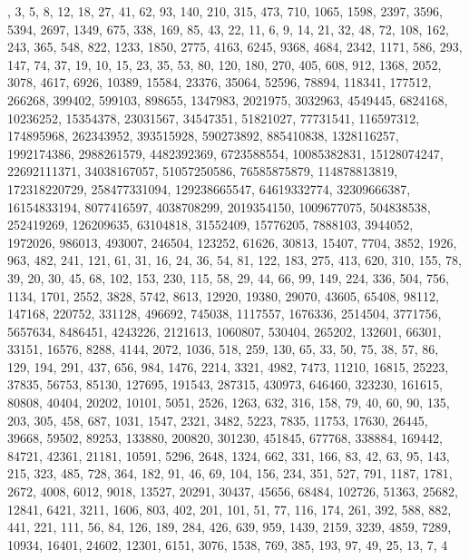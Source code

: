 \documentclass[11pt]{article}
\begin{document}
\begin{table}[h!]
\centering\footnotesize
\begin{minipage}{0.96\textwidth}
\raggedright{}, 3, 5, 8, 12, 18, 27, 41, 62, 93, 140, 210, 315, 473, 710, 1065, 1598, 2397, 3596, 5394, 2697, 1349, 675, 338, 169, 85, 43, 22, 11, 6, 9, 14, 21, 32, 48, 72, 108, 162, 243, 365, 548, 822, 1233, 1850, 2775, 4163, 6245, 9368, 4684, 2342, 1171, 586, 293, 147, 74, 37, 19, 10, 15, 23, 35, 53, 80, 120, 180, 270, 405, 608, 912, 1368, 2052, 3078, 4617, 6926, 10389, 15584, 23376, 35064, 52596, 78894, 118341, 177512, 266268, 399402, 599103, 898655, 1347983, 2021975, 3032963, 4549445, 6824168, 10236252, 15354378, 23031567, 34547351, 51821027, 77731541, 116597312, 174895968, 262343952, 393515928, 590273892, 885410838, 1328116257, 1992174386, 2988261579, 4482392369, 6723588554, 10085382831, 15128074247, 22692111371, 34038167057, 51057250586, 76585875879, 114878813819, 172318220729, 258477331094, 129238665547, 64619332774, 32309666387, 16154833194, 8077416597, 4038708299, 2019354150, 1009677075, 504838538, 252419269, 126209635, 63104818, 31552409, 15776205, 7888103, 3944052, 1972026, 986013, 493007, 246504, 123252, 61626, 30813, 15407, 7704, 3852, 1926, 963, 482, 241, 121, 61, 31, 16, 24, 36, 54, 81, 122, 183, 275, 413, 620, 310, 155, 78, 39, 20, 30, 45, 68, 102, 153, 230, 115, 58, 29, 44, 66, 99, 149, 224, 336, 504, 756, 1134, 1701, 2552, 3828, 5742, 8613, 12920, 19380, 29070, 43605, 65408, 98112, 147168, 220752, 331128, 496692, 745038, 1117557, 1676336, 2514504, 3771756, 5657634, 8486451, 4243226, 2121613, 1060807, 530404, 265202, 132601, 66301, 33151, 16576, 8288, 4144, 2072, 1036, 518, 259, 130, 65, 33, 50, 75, 38, 57, 86, 129, 194, 291, 437, 656, 984, 1476, 2214, 3321, 4982, 7473, 11210, 16815, 25223, 37835, 56753, 85130, 127695, 191543, 287315, 430973, 646460, 323230, 161615, 80808, 40404, 20202, 10101, 5051, 2526, 1263, 632, 316, 158, 79, 40, 60, 90, 135, 203, 305, 458, 687, 1031, 1547, 2321, 3482, 5223, 7835, 11753, 17630, 26445, 39668, 59502, 89253, 133880, 200820, 301230, 451845, 677768, 338884, 169442, 84721, 42361, 21181, 10591, 5296, 2648, 1324, 662, 331, 166, 83, 42, 63, 95, 143, 215, 323, 485, 728, 364, 182, 91, 46, 69, 104, 156, 234, 351, 527, 791, 1187, 1781, 2672, 4008, 6012, 9018, 13527, 20291, 30437, 45656, 68484, 102726, 51363, 25682, 12841, 6421, 3211, 1606, 803, 402, 201, 101, 51, 77, 116, 174, 261, 392, 588, 882, 441, 221, 111, 56, 84, 126, 189, 284, 426, 639, 959, 1439, 2159, 3239, 4859, 7289, 10934, 16401, 24602, 12301, 6151, 3076, 1538, 769, 385, 193, 97, 49, 25, 13, 7, 4
\end{minipage}
\caption{The 382-vertex simple cycle in the up-down graph $G$ with $a = 240$ up-steps and $2^{382}/3^{240} \approx 3.050403 > 3$.}\label{tab:cycle}
\end{table}
\end{document}
